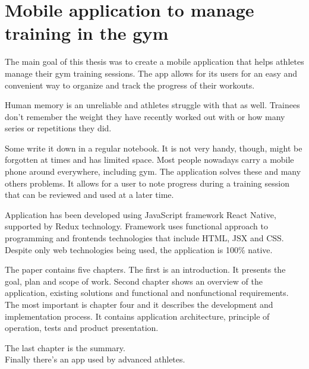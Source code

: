 \chapter*{Mobile application to manage training in the gym}

The main goal of this thesis was to create a mobile application that helps athletes manage their gym training sessions. The app allows for its users for an easy and convenient way to organize and track the progress of their workouts.

Human memory is an unreliable and athletes struggle with that as well. Trainees don’t remember the weight they have recently worked out with or how many series or repetitions they did.
 
Some write it down in a regular notebook. It is not very handy, though, might be forgotten at times and has limited space. Most people nowadays carry a mobile phone around everywhere, including gym. The application solves these and many others problems. It allows for a user to note progress during a training session that can be reviewed and used  at a later time.

Application has been developed using JavaScript framework React Native, supported by Redux technology. Framework uses functional approach to programming and frontends technologies that include HTML, JSX and CSS. Despite only web technologies being used, the application is 100\% native.

The paper contains five chapters. The first is an introduction. It presents the goal, plan and scope of work. Second chapter shows an overview of the application, existing solutions and functional and nonfunctional requirements. The most important is chapter four and it describes the development and implementation process. It contains application architecture, principle of operation, tests and product presentation.
 
The last chapter is the summary. \\
Finally there’s an app used by advanced athletes.


